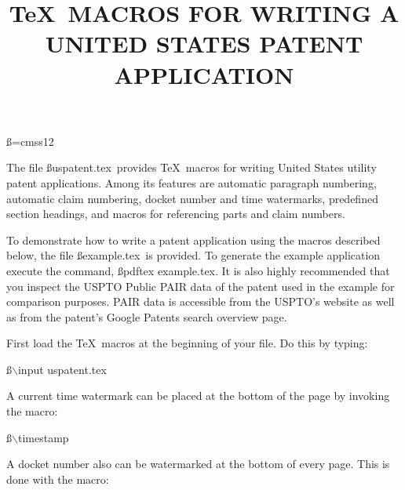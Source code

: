 %
%
%
%


\timestamp

\def\bs{$\backslash$}
\font\ss =cmss12                      %

\title{\TeX\ MACROS FOR WRITING A \nl UNITED STATES PATENT APPLICATION}


The file \ss uspatent.tex\rm\ provides \TeX\ macros for writing United
States utility patent applications.  Among its features are automatic
paragraph numbering, automatic claim numbering, docket number and time
watermarks, predefined section headings, and macros for referencing
parts and claim numbers.

To demonstrate how to write a patent application using the macros
described below, the file \ss example.tex\rm\ is provided.  To
generate the example application execute the command, \ss pdftex
example.tex\rm.  It is also highly recommended that you inspect the
USPTO Public PAIR data of the patent used in the example for
comparison purposes.  PAIR data is accessible from the USPTO's website
as well as from the patent's Google Patents search overview page.


First load the \TeX\ macros at the beginning of
your file.  Do this by typing:

\ss\bs input uspatent.tex
\rm

A current time watermark can be placed at the bottom of the page
by invoking the macro:

\ss\bs timestamp
\rm

A docket number also can be watermarked at the bottom of every page.
This is done with the macro:


